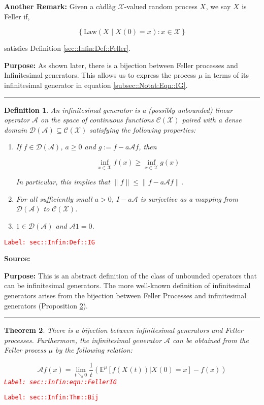 \documentclass[12pt]{article}
\newcommand{\mb}{\mathbb}
\newcommand{\mc}{\mathcal}
\newcommand{\te}{\text}
\newcommand{\tr}{\textcolor{red}}
\newcommand{\labe}[1]{\tr{\texttt{Label: #1}}}
\newcommand{\purpose}{\textbf{Purpose: }}
\newcommand{\lin}{\rule{\linewidth}{0.4 pt}}
\newcommand{\exmu}[2]{\mb{E}^{#1}\left[#2\right]}	%
\newcommand{\x}{x}								%
\renewcommand{\t}{t}							%
\newcommand{\X}{X}								%
\newcommand{\IG}{\mc{A}}						%
\newcommand{\cind}[1]{_{#1}}					%
\newcommand{\tp}[1]{(#1)}						%
\newcommand{\tip}[1]{#1}						%
\newcommand{\core}{\mc{D}}						%
\newcommand{\cont}{\mc{C}}						%
\newcommand{\m}{\mu}							%
\newcommand{\law}{\te{Law}}						%
\newcommand{\spce}{\mc{X}}						%
\newtheorem{thms}{Theorem}[section]
\newtheorem{defn}[thms]{Definition}
\begin{document}
\textbf{Another Remark: } Given a c\`adl\`ag \(\spce\)-valued random process \(\X\cind{}\tip{}\), we say \(\X\cind{}\tip{}\) is Feller if,

\[\left\{\law\left(\X\cind{}\tip{}\middle|\X\cind{}\tp{0} = \x\cind{}\tip{}\right): \x\cind{}\tip{} \in \spce\right\}\]

satisfies Definition \ref{sec::Infin:Def::Feller}.

\purpose As shown later, there is a bijection between Feller processes and Infinitesimal generators. This allows us to express the process \(\mu\) in terms of its infinitesimal generator in equation \eqref{subsec::Notat:Eqn::IG}.

\lin

\begin{defn}
An infinitesimal generator is a (possibly unbounded) linear operator \(\IG{}\) on the space of continuous functions \(\cont(\spce)\) paired with a dense domain \(\core(\IG{}) \subseteq \cont(\spce)\) satisfying the following properties:

\begin{enumerate}
\item If \(f \in \mc{D}(\IG{})\), \(a \geq 0\) and \(g:= f - a\IG{} f\), then 

\[\inf_{\x \in \spce} f(\x) \geq \inf_{\x \in \spce} g(\x)\]

\noindent In particular, this implies that \(\|f\| \leq \|f - a\IG{} f\|\).

\item For all sufficiently small \(a > 0\), \(I - a\IG{}\) is surjective as a mapping from \(\mc{D}(\IG{})\) to \(\cont(\spce)\).

\item \(1 \in \core(\IG{})\) and \(\IG{} 1 = 0\).
\end{enumerate}
\label{sec::Infin:Def::IG}
\end{defn}
\labe{sec::Infin:Def::IG}

\textbf{Source: }\cite[Definitions 2.1,2.7]{Lig85}

\purpose This is an abstract definition of the class of unbounded operators that can be infinitesimal generators. The more well-known definition of infinitesimal generators arises from the bijection between Feller Processes and infinitesimal generators (Proposition \ref{sec::Infin:Thm::Bij}).

\lin

\begin{thms}
There is a bijection between infinitesimal generators and Feller processes. Furthermore, the infinitesimal generator \(\IG{}\) can be obtained from the Feller process \(\m\) by the following relation:

\begin{equation}
\IG f(\x) = \lim_{\t\searrow 0} \frac{1}{\t}\left(\exmu{\m}{f(\X\cind{}\tp{\t})|\X\cind{}\tp{0}=\x} - f(\x)\right)
\label{sec::Infin:eqn::FellerIG}
\end{equation}
\labe{sec::Infin:eqn::FellerIG}
\label{sec::Infin:Thm::Bij}
\end{thms}
\labe{sec::Infin:Thm::Bij}
\end{document}
